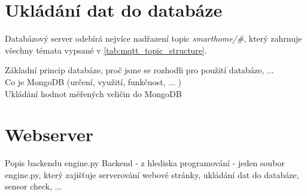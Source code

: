 \section{Ukládání dat do databáze} \label{sec:database}

Databázový server odebírá nejvíce nadřazení topic \textit{smarthome/\#}, který zahrnuje všechny témata vypsané v \cref{tab:mqtt_topic_structure}.

Základní princip databáze, proč jsme se rozhodli pro použití databáze,  ... \\
Co je MongoDB (určení, využití, funkčnost, ... ) \\
Ukládání hodnot měřených veličin do MongoDB \\

\section{Webserver} \label{sec:webserver}

Popis backendu engine.py
Backend - z hlediska programování - jeden soubor engine.py, který zajišťuje serverování webové stránky, ukládání dat do databáze, sensor check, ... \\



